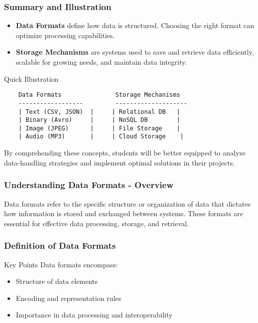 \documentclass[aspectratio=169]{beamer}
\begin{document}
\begin{frame}[fragile]
    \frametitle{Summary and Illustration}
    \begin{itemize}
        \item \textbf{Data Formats} define how data is structured. Choosing the right format can optimize processing capabilities.
        \item \textbf{Storage Mechanisms} are systems used to save and retrieve data efficiently, scalable for growing needs, and maintain data integrity.
    \end{itemize}
    
    \begin{block}{Quick Illustration}
    \begin{verbatim}
    Data Formats               Storage Mechanisms
    ------------------         --------------------
    | Text (CSV, JSON)  |     | Relational DB   |
    | Binary (Avro)     |     | NoSQL DB        |
    | Image (JPEG)      |     | File Storage    |
    | Audio (MP3)       |     | Cloud Storage    |
    \end{verbatim}
    \end{block}
    
    By comprehending these concepts, students will be better equipped to analyze data-handling strategies and implement optimal solutions in their projects.
\end{frame}

\begin{frame}[fragile]
    \frametitle{Understanding Data Formats - Overview}
    Data formats refer to the specific structure or organization of data that dictates how information is stored and exchanged between systems. These formats are essential for effective data processing, storage, and retrieval.
\end{frame}

\begin{frame}[fragile]
    \frametitle{Definition of Data Formats}
    \begin{block}{Key Points}
        Data formats encompass:
        \begin{itemize}
            \item Structure of data elements
            \item Encoding and representation rules
            \item Importance in data processing and interoperability
        \end{itemize}
    \end{block}
\end{frame}
\end{document}
